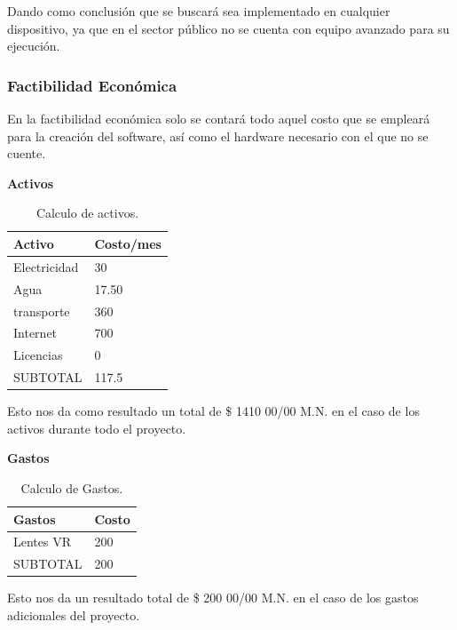 \documentclass[10pt]{article}
\begin{document}
\newpage

Dando como conclusión que se buscará sea implementado en cualquier dispositivo, ya que en el sector público no se cuenta con equipo avanzado para su ejecución.

\subsubsection{Factibilidad Económica}

En la factibilidad económica solo se contará todo aquel costo que se empleará para la creación del software, así como el hardware necesario con el que no se cuente.

\textbf{Activos}

\begin{table}[htbp]
\begin{center}
\begin{tabular}{|p{4.2cm}|p{4.2cm}|}
\hline
Activo & Costo/mes  \\
\hline
Electricidad &  30 \\
\hline
Agua &  17.50 \\
\hline
transporte &  360 \\
\hline
Internet & 700\\
\hline
Licencias & 0\\
\hline
SUBTOTAL & 117.5\\
\hline
\end{tabular}
\caption{Calculo de activos.}
\label{tabla1}
\end{center}
\end{table}

Esto nos da como resultado un total de \$ 1410 00/00 M.N. en el caso de los activos durante todo el proyecto. 

\textbf{Gastos}

\begin{table}[htbp]
\begin{center}
\begin{tabular}{|p{4.2cm}|p{4.2cm}|}
\hline
Gastos & Costo\\
\hline
Lentes VR &  200 \\
\hline
SUBTOTAL & 200\\
\hline
\end{tabular}
\caption{Calculo de Gastos.}
\label{tabla1}
\end{center}
\end{table}

Esto nos da un resultado total de \$ 200 00/00 M.N. en el caso de los gastos adicionales del proyecto. 
\end{document}
